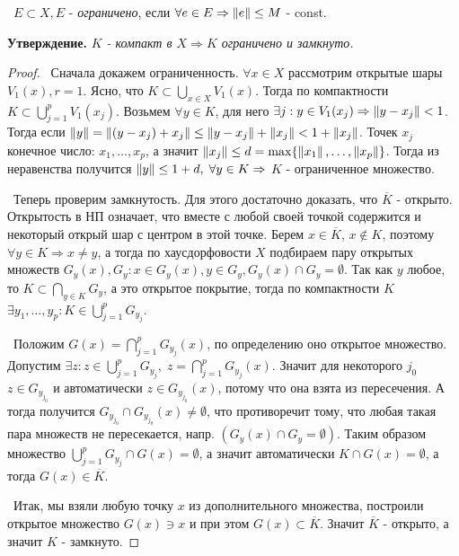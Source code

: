\medskip
\noindent\textbullet~$E \subset X, E$ - \textit{ограничено}, если $\forall e \in E \Rightarrow \left\lVert e\right\rVert \le M$ - const.

\bigskip 
\noindent\textbf{Утверждение.}\textit{ $K$ - компакт в $X \Rightarrow K$ ограничено и замкнуто.}
\par\begin{proof}
\smallskip
\par\noindent\textbullet~Сначала докажем ограниченность. $\forall x \in X$ рассмотрим открытые шары $V_1(x), r = 1$. Ясно, что $K \subset \bigcup_{x \in X} V_1(x)$. Тогда по 
компактности $K \subset \bigcup_{j = 1}^p V_1(x_j)$. Возьмем $\forall y \in K$, для него $\exists j : y \in V_1(x_j) \Rightarrow \left\lVert y - x_j\right\rVert < 1$. Тогда если $\left\lVert y\right\rVert =
\left\lVert(y - x_j) + x_j\right\rVert \le \left\lVert y - x_j\right\rVert + \left\lVert x_j\right\rVert < 1 + \left\lVert x_j\right\rVert$. Точек $x_j$ конечное число: $x_1, \dots, x_p$, а значит $\left\lVert x_j\right\rVert \le d = \max \{ \left\lVert x_1\right\rVert, 
\dots, \left\lVert x_p\right\rVert\}$. Тогда из неравенства получится $\left\lVert y\right\rVert \le 1 + d, \; \forall y \in K \Rightarrow$ $K$ - ограниченное множество.

\medskip
\noindent\textbullet~Теперь проверим замкнутость. Для этого достаточно доказать, что $\overline{K}$ - открыто. Открытость в НП означает, что вместе с любой своей точкой 
содержится и некоторый открый шар с центром в этой точке. Берем $x \in \overline{K}$, $x \notin K$, поэтому $\forall y \in K \Rightarrow x \neq y$, а тогда по 
хаусдорфовости $X$ подбираем пару открытых множеств $G_y(x), G_y : x \in G_y(x), y \in G_y, G_y(x) \cap G_y = \emptyset$. Так как $y$ любое, то $K \subset 
\bigcap_{y \in K}G_y$, а это открытое покрытие, тогда по компактности $K$ $\exists y_1, \dots, y_p : K \in \bigcup_{j = 1}^p G_{y_j}$.  

\smallskip
\noindent\textbullet~Положим $G(x) = \bigcap_{j = 1}^p G_{y_j}(x)$, по определению оно открытое множество. Допустим $\exists z : z \in \bigcup_{j = 1}^p G_{y_j}, \;z = \bigcap_{j = 1}^p G_{y_j}(x)$. Значит для некоторого $j_0$ $z \in G_{y_{j_0}}$ и автоматически $z \in 
G_{y_{j_0}}(x)$, потому что она взята из пересечения. А тогда получится $G_{y_{j_0}} \cap G_{y_{j_0}}(x) \neq \emptyset$, что противоречит тому, что любая такая пара
множеств не пересекается, напр. $(G_y(x) \cap G_y = \emptyset)$. Таким образом множество $\bigcup_{j = 1}^p G_{y_j} \cap G(x) = \emptyset$, а значит автоматически $K \cap G(x) 
= \emptyset$, а тогда $G(x) \in \overline{K}$. 

\smallskip
\noindent\textbullet~Итак, мы взяли любую точку $x$ из дополнительного множества, построили открытое множество $G(x) \ni x$ и при этом $G(x) \subset \overline{K}$. 
Значит $\overline{K}$ - открыто, а значит $K$ - замкнуто.
\end{proof}

